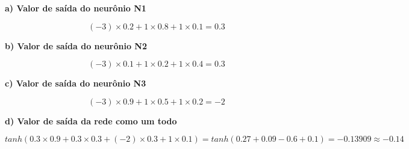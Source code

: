 
\begin{adjustwidth}{1em}{}
\textbf{a) Valor de saída do neurônio N1}
\end{adjustwidth}
\begin{equation*}
    (-3)\times0.2 + 1\times0.8 + 1\times0.1 = 0.3
\end{equation*}

\begin{adjustwidth}{1em}{}
\textbf{b) Valor de saída do neurônio N2}
\end{adjustwidth}
\begin{equation*}
    (-3)\times0.1 + 1\times0.2 + 1\times0.4 = 0.3
\end{equation*}

\begin{adjustwidth}{1em}{}
\textbf{c) Valor de saída do neurônio N3}
\end{adjustwidth}
\begin{equation*}
    (-3)\times0.9 + 1\times0.5 + 1\times0.2 = -2
\end{equation*}

\begin{adjustwidth}{1em}{}
\textbf{d) Valor de saída da rede como um todo}
\end{adjustwidth}
\begin{equation*}
    tanh(0.3\times0.9 + 0.3\times0.3 + (-2)\times0.3 + 1\times0.1) = tanh(0.27 + 0.09 - 0.6 + 0.1) = -0.13909 \approx -0.14
\end{equation*}
